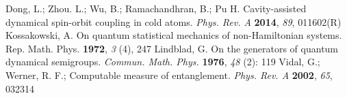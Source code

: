 \documentclass[atoms,article,submit,moreauthors,pdftex,12pt,a4paper]{mdpi}
\begin{document}
\begin{thebibliography}{999}
Dong, L.; Zhou. L.; Wu, B.; Ramachandhran, B.; Pu H. Cavity-assisted dynamical spin-orbit coupling in cold atoms. {\em Phys. Rev. A} {\bf 2014}, {\em 89}, 011602(R)
Kossakowski, A. On quantum statistical mechanics of non-Hamiltonian systems. {Rep. Math. Phys.} {\bf 1972}, {\em 3} (4), 247
Lindblad, G. On the generators of quantum dynamical semigroups. {\em Commun. Math. Phys.} {\bf 1976}, {\em 48} (2): 119
Vidal, G.; Werner, R. F.; Computable measure of entanglement. {\em Phys. Rev. A} {\bf 2002}, {\em 65}, 032314
\end{thebibliography}
\end{document}
